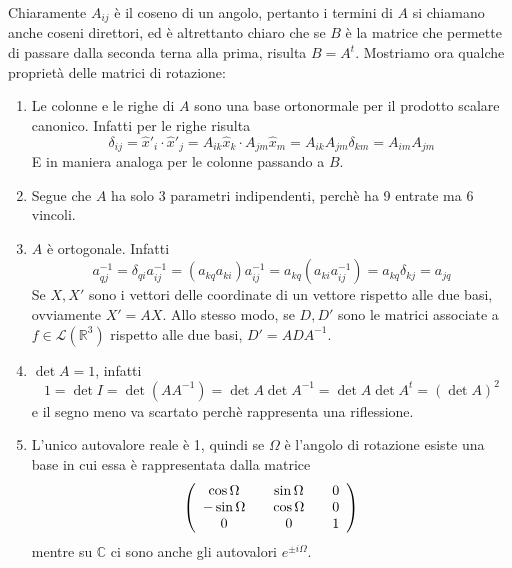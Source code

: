 \documentclass[a4paper,11pt]{article}
\begin{document}
\noindent Chiaramente $A_{ij}$ è il coseno di un angolo, pertanto i termini di $A$ si chiamano anche coseni direttori, ed è altrettanto chiaro che se $B$ è la matrice che permette di passare dalla seconda terna alla prima, risulta $B=A^t$. Mostriamo ora qualche proprietà delle matrici di rotazione:
\begin{enumerate}
	\item Le colonne e le righe di $A$ sono una base ortonormale per il prodotto scalare canonico. Infatti per le righe risulta $$\delta_{ij}=\hat{x}'_i\cdot\hat{x}'_j=A_{ik}\hat{x}_k\cdot A_{jm}\hat{x}_m=A_{ik}A_{jm}\delta_{km}=A_{im}A_{jm}$$
	E in maniera analoga per le colonne passando a $B$.
	\item Segue che $A$ ha solo 3 parametri indipendenti, perchè ha 9 entrate ma 6 vincoli.
	\item $A$ è ortogonale. Infatti $$a^{-1}_{qj}=\delta_{qi}a^{-1}_{ij}=(a_{kq}a_{ki})a^{-1}_{ij}=a_{kq}(a_{ki}a^{-1}_{ij})=a_{kq}\delta_{kj}=a_{jq}$$
	\indent Se $X,X'$ sono i vettori delle coordinate di un vettore rispetto alle due basi, ovviamente $X'=AX$. Allo stesso modo, se $D,D'$ sono le matrici associate a $f\in\mathcal{L}(\mathbb{R}^3)$ rispetto alle due basi, $D'=ADA^{-1}$.
	\item $\det A=1$, infatti $$1=\det I=\det(AA^{-1})=\det A\det A^{-1}=\det A\det A^t=(\det A)^2$$ e il segno meno va scartato perchè rappresenta una riflessione.
	\item L'unico autovalore reale è 1, quindi se $\Omega$ è l'angolo di rotazione esiste una base in cui essa è rappresentata dalla matrice
	$$\left(\begin{array}{c c c c c}
	\cos\Omega & & \sin\Omega & & 0 \\
	-\sin\Omega & & \cos\Omega & & 0 \\
	0 & & 0 & & 1 \\
	\end{array}\right)$$
	mentre su $\mathbb{C}$ ci sono anche gli autovalori $e^{\pm i\Omega}$. 
\end{enumerate}
\end{document}
